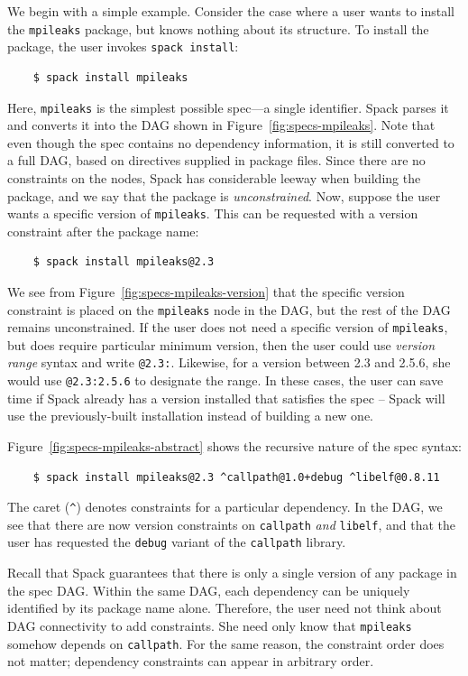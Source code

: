 We begin with a simple example.
Consider the case where a user wants to install the {\tt mpileaks} package, but knows
nothing about its structure.  To install the package, the user invokes {\tt spack install}:
%
\begin{verbatim}
    $ spack install mpileaks
\end{verbatim}
%
Here, {\tt mpileaks} is the simplest possible spec---a single identifier.
Spack parses it and converts it into the DAG shown in Figure~\ref{fig:specs-mpileaks}.
Note that even though the spec contains no dependency information, it is still
converted to a full DAG, based on directives supplied in package files. Since there
are no constraints on the nodes, Spack has considerable leeway when building the
package, and we say that the package is {\it unconstrained}.
%
Now, suppose the user wants a specific version of {\tt mpileaks}.  This can be requested
with a version constraint after the package name:
%
\begin{verbatim}
    $ spack install mpileaks@2.3
\end{verbatim}
%
We see from Figure~\ref{fig:specs-mpileaks-version} that the specific version constraint is
placed on the {\tt mpileaks} node in the DAG, but the rest of the DAG remains unconstrained.
If the user does not need a specific version of {\tt mpileaks}, but does require
particular minimum version, then the user could use {\it version range} syntax
and write {\tt @2.3:}.  Likewise, for a version between 2.3 and 2.5.6, she would use
{\tt @2.3:2.5.6} to designate the range. In these cases, the user can save time if
Spack already has a version installed that satisfies the spec -- Spack will use
the previously-built installation instead of building a new one.

Figure~\ref{fig:specs-mpileaks-abstract} shows the recursive nature of the spec syntax:
%
\begin{verbatim}
    $ spack install mpileaks@2.3 ^callpath@1.0+debug ^libelf@0.8.11
\end{verbatim}
%
The caret (\verb|^|) denotes constraints for a particular dependency.  In the DAG,
we see that there are now version constraints on {\tt callpath} {\it and} {\tt libelf},
and that the user has requested the {\tt debug} variant of the {\tt callpath} library.

Recall that Spack guarantees that there is only a single version of any package in
the spec DAG.  Within the same DAG, each dependency can be uniquely
identified by its package name alone.  Therefore, the user need not think about DAG
connectivity to add constraints.  She need only know that {\tt mpileaks}
somehow depends on {\tt callpath}.
For the same reason, the constraint order does not matter; dependency constraints
can appear in arbitrary order.

